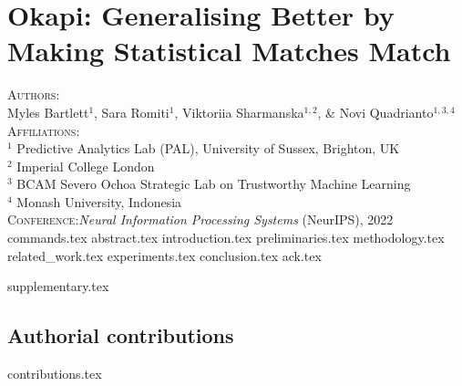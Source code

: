 \chapter{Okapi: Generalising Better by Making Statistical Matches Match}\label{ch:okapi}
\textsc{Authors}:\\
%
Myles Bartlett$^1$,
%
Sara Romiti$^1$,
%
Viktoriia Sharmanska$^{1,2}$,
%
\& Novi Quadrianto$^{1,3,4}$ \\
%
\textsc{Affiliations}:\\
%
$^1$ Predictive Analytics Lab (PAL), University of Sussex, Brighton, UK\\
%
$^2$ Imperial College London \\
%
$^3$ BCAM Severo Ochoa Strategic Lab on Trustworthy Machine Learning \\
%
$^4$ Monash University, Indonesia \\
%
\textsc{Conference}:\;\;\textit{Neural Information Processing Systems} (NeurIPS), 2022 \\
%
{commands.tex}
{abstract.tex}
{introduction.tex}
{preliminaries.tex}
{methodology.tex}
{related_work.tex}
{experiments.tex}
{conclusion.tex}
{ack.tex}

\newpage
{supplementary.tex}
%
\clearpage
\section{Authorial contributions}
{contributions.tex}
